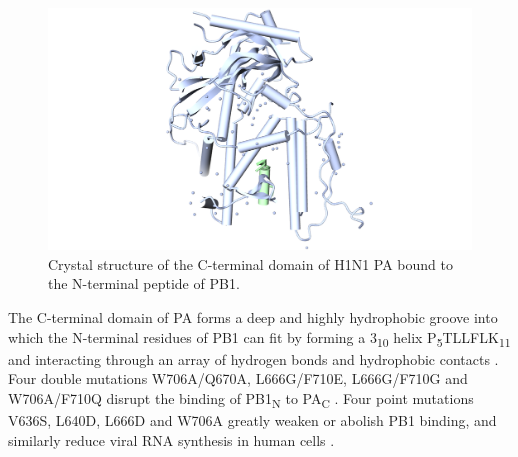 \begin{figure}
\centering
\includegraphics[width=\linewidth]{../influenza/2ZNL.png}
\caption{Crystal structure of the C-terminal domain of H1N1 PA bound to the N-terminal peptide of PB1.}
\label{influenza:2ZNL}
\end{figure}

The C-terminal domain of PA forms a deep and highly hydrophobic groove into which the N-terminal residues of PB1 can fit by forming a 3\textsubscript{10} helix P\textsubscript{5}TLLFLK\textsubscript{11} and interacting through an array of hydrogen bonds and hydrophobic contacts \citep{1141}. Four double mutations W706A/Q670A, L666G/F710E, L666G/F710G and W706A/F710Q disrupt the binding of PB1\textsubscript{N} to PA\textsubscript{C} \citep{1540}. Four point mutations V636S, L640D, L666D and W706A greatly weaken or abolish PB1 binding, and similarly reduce viral RNA synthesis in human cells \citep{1141}.

